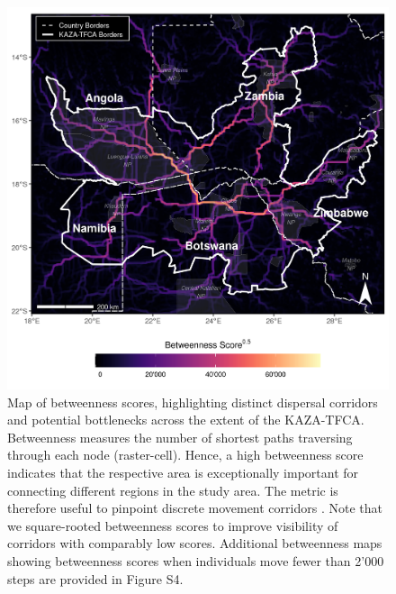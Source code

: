 \documentclass[abstract=on,10pt,a4paper,bibliography=totocnumbered]{article}
\begin{document}
\begin{figure}
  \includegraphics[width=\textwidth]{99_Betweenness.png}
  \caption{Map of betweenness scores, highlighting distinct dispersal corridors
  and potential bottlenecks across the extent of the KAZA-TFCA. Betweenness
  measures the number of shortest paths traversing through each node
  (raster-cell). Hence, a high betweenness score indicates that the respective
  area is exceptionally important for connecting different regions in the study
  area. The metric is therefore useful to pinpoint discrete movement corridors
  \citep{BastilleRousseau.2018}. Note that we square-rooted betweenness scores
  to improve visibility of corridors with comparably low scores. Additional
  betweenness maps showing betweenness scores when individuals move fewer than
  2'000 steps are provided in Figure S4.}
  \label{Betweenness}
\end{figure}
\end{document}
